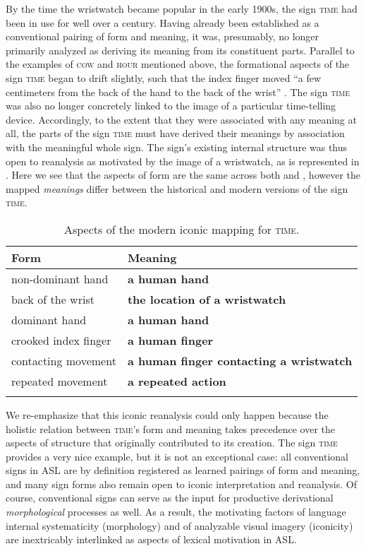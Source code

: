 \documentclass[output=paper,
modfonts
]{LSP/langsci}
\begin{document}
By the time the wristwatch became popular in the early 1900s, the sign \textsc{time} had been in use for well over a century. Having already been established as a conventional pairing of form and meaning, it was, presumably, no longer primarily analyzed as deriving its meaning from its constituent parts. Parallel to the examples of \textsc{cow} and \textsc{hour} mentioned above, the formational aspects of the sign \textsc{time} began to drift slightly, such that the index finger moved ``a few centimeters from the back of the hand to the back of the wrist'' \citep[178]{Shaw2010}. The sign \textsc{time} was also no longer concretely linked to the image of a particular time-telling device. Accordingly, to the extent that they were associated with any meaning at all, the parts of the sign \textsc{time} must have derived their meanings by association with the meaningful whole sign. The sign's existing internal structure was thus open to reanalysis as motivated by the image of a wristwatch, as is represented in . Here we see that the aspects of form are the same across both  and , however the mapped \textit{meanings} differ between the historical and modern versions of the sign \textsc{time.} 

\begin{table}
\caption{Aspects of the modern iconic mapping for \textsc{time}.}
\label{tab:4}
\begin{tabular}{ll}
\lsptoprule
Form & Meaning\\
\midrule
non-dominant hand & \textbf{a human hand}\\

back of the wrist & \textbf{the location of a wristwatch}\\

dominant hand & \textbf{a human hand}\\

crooked index finger & \textbf{a human finger}\\

contacting movement & \textbf{a human finger contacting a wristwatch}\\

repeated movement & \textbf{a repeated action}\\
\lspbottomrule
\end{tabular}
\end{table}

We re-emphasize that this iconic reanalysis could only happen because the holistic relation between \textsc{time}'s form and meaning takes precedence over the aspects of structure that originally contributed to its creation. The sign \textsc{time} provides a very nice example, but it is not an exceptional case: all conventional signs in ASL are by definition registered as learned pairings of form and meaning, and many sign forms also remain open to iconic interpretation and reanalysis. Of course, conventional signs can serve as the input for productive derivational \textit{morphological} processes as well. As a result, the motivating factors of language internal systematicity (morphology) and of analyzable visual imagery (iconicity) are inextricably interlinked as aspects of lexical motivation in ASL.
\end{document}
